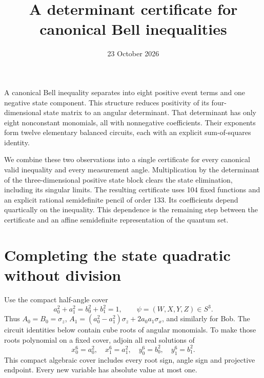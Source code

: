 \documentclass[11pt]{article}
\title{A determinant certificate for canonical Bell inequalities}
\author{}
\date{23 October 2026}
\begin{document}
\maketitle
\vspace{-2em}

A canonical Bell inequality separates into eight positive event terms and
one negative state component. This structure reduces positivity of its
four-dimensional state matrix to an angular determinant. That determinant
has only eight nonconstant monomials, all with nonnegative coefficients.
Their exponents form twelve elementary balanced circuits, each with an
explicit sum-of-squares identity.

We combine these two observations into a single certificate for every
canonical valid inequality and every measurement angle. Multiplication by
the determinant of the three-dimensional positive state block clears the
state elimination, including its singular limits. The resulting certificate
uses 104 fixed functions and an explicit rational semidefinite pencil of
order 133. Its coefficients depend quartically on the inequality. This
dependence is the remaining step between the certificate and an affine
semidefinite representation of the quantum set.

\section{Completing the state quadratic without division}

Use the compact half-angle cover
\[
 a_0^2+a_1^2=b_0^2+b_1^2=1,
 \qquad \psi=(W,X,Y,Z)\in S^3.
\]
Thus $A_0=B_0=\sigma_z$,
$A_1=(a_0^2-a_1^2)\sigma_z+2a_0a_1\sigma_x$, and similarly for Bob.
The circuit identities below contain cube roots of angular monomials.
To make those roots polynomial on a fixed cover, adjoin all real solutions of
\[
 x_0^6=a_0^2,\quad x_1^6=a_1^2,\quad
 y_0^6=b_0^2,\quad y_1^6=b_1^2.                       \tag{1}
\]
This compact algebraic cover includes every root sign, angle sign and
projective endpoint. Every new variable has absolute value at most one.
\end{document}
